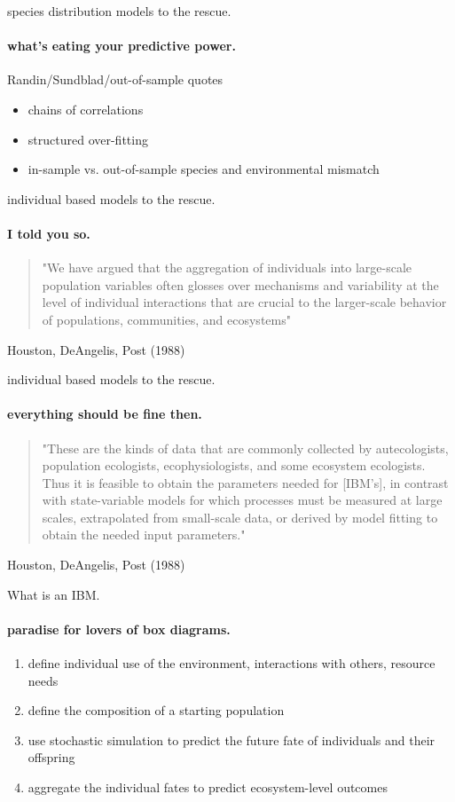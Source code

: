 \documentclass[show notes]{beamer}
\begin{document}
\begin{frame}{species distribution models to the rescue.}
  \framesubtitle{what's eating your predictive power.} 
   
   Randin/Sundblad/out-of-sample quotes
   \begin{itemize}
   \item chains of correlations
   \item structured over-fitting
   \item in-sample vs. out-of-sample species and environmental mismatch
   \end{itemize}

\end{frame}


\begin{frame}{individual based models to the rescue.}
  \framesubtitle{I told you so.} 

\begin{quote}
"We have argued that the aggregation of individuals 
into large-scale population variables often glosses over mechanisms and 
variability at the level of individual interactions that are crucial 
to the larger-scale behavior of populations, communities, and ecosystems"
\end{quote}
Houston, DeAngelis, Post (1988)
  
\end{frame}

\begin{frame}{individual based models to the rescue.}
  \framesubtitle{everything should be fine then.} 

\begin{quote}
"These are the kinds of data that are commonly collected 
by autecologists, population ecologists, ecophysiologists, and some 
ecosystem ecologists. Thus it is feasible to obtain the parameters needed 
for [IBM's], in contrast with state-variable models for 
which processes must be measured at large scales, extrapolated from 
small-scale data, or derived by model fitting to obtain the needed input parameters."
\end{quote}
Houston, DeAngelis, Post (1988)

\end{frame}

\begin{frame}{What is an IBM.}
	\framesubtitle{paradise for lovers of box diagrams.}
    
    \begin{enumerate}
    \item define individual use of the environment, interactions with others, resource needs
    \item define the composition of a starting population
    \item use stochastic simulation to predict the future fate of individuals and their offspring
    \item aggregate the individual fates to predict ecosystem-level outcomes
    \end{enumerate}
    

\end{frame}
\end{document}
